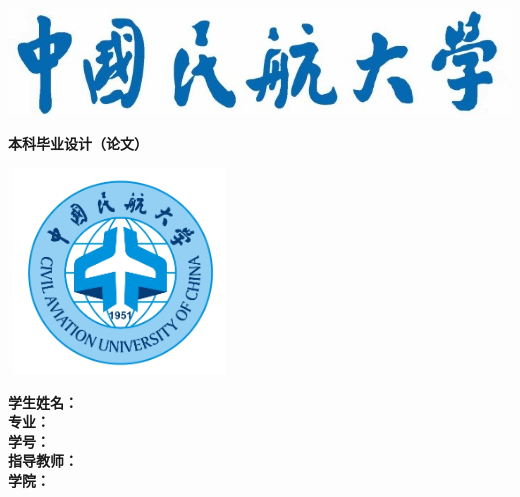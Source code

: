 \begin{titlepage}
    \setlength{\headsep}{1.3cm}
    {
    
              \begin{center}
              \includegraphics[]{./pic/pic1.jpg}
              \end{center}
    }
              \vspace{-12mm}
            \begin{center}
                \setlength{\baselineskip}{0pt}\bfseries\fakeli {}本科毕业设计（论文）
            \end{center}
    
            \vspace{-3.8mm}
              \begin{center}
              \includegraphics[height=5.45cm,width=5.9cm]{./pic/pic2.png}
              \end{center}
            \vspace{-1pt}
            \begin{center}\fakehei{}\Title \end{center}
            \vspace{8ex}
    \begin{center}
        \bfseries\songti
        \setlength{\baselineskip}{32pt} %
        {\bfseries 学生姓名：}\underlineFixlen[11em]{\StudentName}\\
        {\bfseries 专\hspace{2em}业：}\underlineFixlen[11em]{\Major}\\
        {\bfseries 学\hspace{2em}号：}\underlineFixlen[11em]{\StudentID}\\
        {\bfseries 指导教师：}\underlineFixlen[11em]{\AdvisorName}\\
        {\bfseries 学\hspace{2em}院：}\underlineFixlen[11em]{\Department}\\
        

\end{center}
\end{titlepage}
